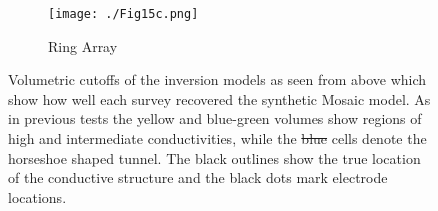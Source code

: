 \documentclass[preprint,authoryear,12pt]{elsarticle}
\providecommand{\DIFaddtex}[1]{{\protect\color{blue}\uwave{#1}}} %
\providecommand{\DIFdeltex}[1]{{\protect\color{red}\sout{#1}}}                      %
\providecommand{\DIFaddFL}[1]{\DIFadd{#1}} %
\providecommand{\DIFdelFL}[1]{\DIFdel{#1}} %
\providecommand{\DIFaddbeginFL}{} %
\providecommand{\DIFaddendFL}{} %
\providecommand{\DIFdelbeginFL}{} %
\providecommand{\DIFdelendFL}{} %
\providecommand{\DIFadd}[1]{\texorpdfstring{\DIFaddtex{#1}}{#1}} %
\providecommand{\DIFdel}[1]{\texorpdfstring{\DIFdeltex{#1}}{}} %
\begin{document}
\begin{figure}[htp]{}
\begin{center}
      \begin{subfigure}{0.48\linewidth}
         \label{fig:SynthMosaic_Horseshoe_Ring_Top}
         \DIFdelbeginFL %
\DIFdelendFL \DIFaddbeginFL \texttt{[image: ./Fig15c.png]}
         \DIFaddendFL \caption{Ring Array}
      \end{subfigure}
      \vspace{0.2cm}
   \end{center}
\vspace{-0.4cm}
\caption{Volumetric cutoffs of the inversion models as seen from above which show how well each survey recovered the synthetic Mosaic model. As in previous tests the yellow and blue-green volumes show regions of high and intermediate conductivities, while the \DIFdelbeginFL \DIFdelFL{blue }\DIFdelendFL \DIFaddbeginFL \DIFaddFL{dark purple }\DIFaddendFL cells denote the horseshoe shaped tunnel. The black outlines show the true location of the conductive structure and the black dots mark electrode locations.}
\label{fig:Horseshoe_SynthMosaic2_Isosurfaces_Top}
\end{figure}
\end{document}
